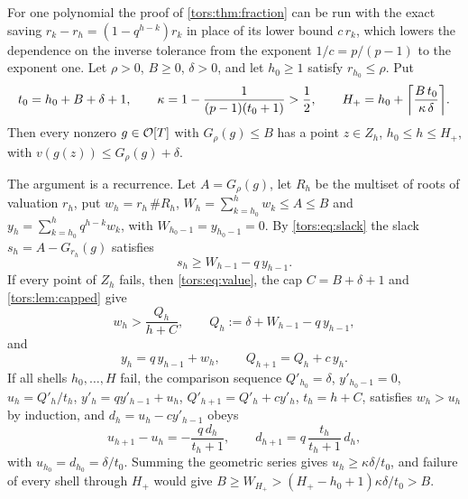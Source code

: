 \begin{remark}\label{tors:prop:linear}\label{tors:rem:linear}
For one polynomial the proof of \cref{tors:thm:fraction} can be run with the exact saving
$r_k-r_h=(1-q^{h-k})r_k$ in place of its lower bound $c\,r_k$, which lowers the dependence
on the inverse tolerance from the exponent $1/c=p/(p-1)$ to the exponent one. Let
$\rho>0$, $B\ge0$, $\delta>0$, and let $h_0\ge1$ satisfy $r_{h_0}\le\rho$. Put
\[
  t_0=h_0+B+\delta+1,\qquad \kappa=1-\frac1{(p-1)(t_0+1)}>\frac12,\qquad
  H_+=h_0+\ceil*{\frac{B\,t_0}{\kappa\,\delta}} .
\]
Then every nonzero $g\in\mathcal{O}[T]$ with $G_\rho(g)\le B$ has a point $z\in Z_h$,
$h_0\le h\le H_+$, with $v(g(z))\le G_\rho(g)+\delta$.

The argument is a recurrence. Let $A=G_\rho(g)$, let $R_h$ be the multiset of roots of
valuation $r_h$, put $w_h=r_h\,\#R_h$, $W_h=\sum_{k=h_0}^hw_k\le A\le B$ and
$y_h=\sum_{k=h_0}^hq^{h-k}w_k$, with $W_{h_0-1}=y_{h_0-1}=0$. By \eqref{tors:eq:slack} the
slack $s_h=A-G_{r_h}(g)$ satisfies
\begin{equation}\label{tors:eq:exactslack}
  s_h\ge W_{h-1}-q\,y_{h-1}.
\end{equation}
If every point of $Z_h$ fails, then \eqref{tors:eq:value}, the cap $C=B+\delta+1$ and
\cref{tors:lem:capped} give
\begin{equation}\label{tors:eq:failure}
  w_h>\frac{Q_h}{h+C},\qquad Q_h:=\delta+W_{h-1}-q\,y_{h-1},
\end{equation}
and
\begin{equation}\label{tors:eq:update}
  y_h=q\,y_{h-1}+w_h,\qquad Q_{h+1}=Q_h+c\,y_h .
\end{equation}
If all shells $h_0,\dots,H$ fail, the comparison sequence $Q'_{h_0}=\delta$,
$y'_{h_0-1}=0$, $u_h=Q'_h/t_h$, $y'_h=qy'_{h-1}+u_h$, $Q'_{h+1}=Q'_h+cy'_h$, $t_h=h+C$,
satisfies $w_h>u_h$ by induction, and $d_h=u_h-cy'_{h-1}$ obeys
\begin{equation}\label{tors:eq:defect}
  u_{h+1}-u_h=-\frac{q\,d_h}{t_h+1},\qquad d_{h+1}=q\,\frac{t_h}{t_h+1}\,d_h ,
\end{equation}
with $u_{h_0}=d_{h_0}=\delta/t_0$. Summing the geometric series gives
$u_h\ge\kappa\delta/t_0$, and failure of every shell through $H_+$ would give
$B\ge W_{H_+}>(H_+-h_0+1)\kappa\delta/t_0>B$.


\end{remark}
